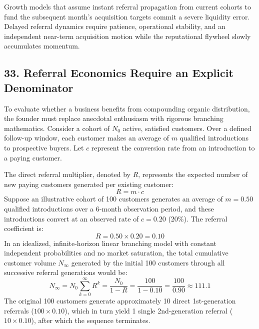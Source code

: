 Growth models that assume instant referral propagation from current cohorts to fund the subsequent month's acquisition targets commit a severe liquidity error. Delayed referral dynamics require patience, operational stability, and an independent near-term acquisition motion while the reputational flywheel slowly accumulates momentum.

\subsection*{33. Referral Economics Require an Explicit Denominator}

To evaluate whether a business benefits from compounding organic distribution, the founder must replace anecdotal enthusiasm with rigorous branching mathematics. Consider a cohort of $N_0$ active, satisfied customers. Over a defined follow-up window, each customer makes an average of $m$ qualified introductions to prospective buyers. Let $c$ represent the conversion rate from an introduction to a paying customer.

The direct referral multiplier, denoted by $R$, represents the expected number of new paying customers generated per existing customer:
\begin{equation}
R = m \cdot c
\end{equation}
Suppose an illustrative cohort of 100 customers generates an average of $m = 0.50$ qualified introductions over a 6-month observation period, and these introductions convert at an observed rate of $c = 0.20$ (20\%). The referral coefficient is:
\begin{equation}
R = 0.50 \times 0.20 = 0.10
\end{equation}
In an idealized, infinite-horizon linear branching model with constant independent probabilities and no market saturation, the total cumulative customer volume $N_{\infty}$ generated by the initial 100 customers through all successive referral generations would be:
\begin{equation}
N_{\infty} = N_0 \sum_{k=0}^{\infty} R^k = \frac{N_0}{1 - R} = \frac{100}{1 - 0.10} = \frac{100}{0.90} \approx 111.1
\end{equation}
The original 100 customers generate approximately 10 direct 1st-generation referrals ($100 \times 0.10$), which in turn yield 1 single 2nd-generation referral ($10 \times 0.10$), after which the sequence terminates.

